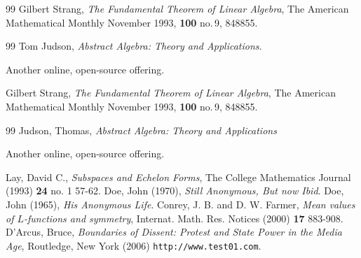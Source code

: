 \documentclass{amsart}
\theoremstyle{plain}%
\theoremstyle{definition}%
\theoremstyle{remark}%
\newcommand{\mono}[1]{\texttt{#1}}
\numberwithin{equation}{section}
\begin{document}
%
%
%
\typeout{************************************************}
\typeout{************************************************}
%

\begin{thebibliography}{99}
\hypertarget{biblio-strang-article-uno}{}Gilbert Strang, \textit{The Fundamental Theorem of Linear Algebra}, The American Mathematical Monthly November 1993, \textbf{100} no.\@\,9, 848\textendash{}855.
\end{thebibliography}
%
%
\typeout{************************************************}
\typeout{************************************************}
%

\begin{thebibliography}{99}
\hypertarget{biblio-judson-AATA}{}Tom Judson, \textit{Abstract Algebra: Theory and Applications}. \par\hypertarget{note-judson-AATA}{}%
Another online, open-source offering.%

\hypertarget{biblio-strang-article-tres}{}Gilbert Strang, \textit{The Fundamental Theorem of Linear Algebra}, The American Mathematical Monthly November 1993, \textbf{100} no.\@\,9, 848\textendash{}855.
\end{thebibliography}
%
%
\typeout{************************************************}
\typeout{************************************************}
%

\begin{thebibliography}{99}
\hypertarget{biblio-judson-aata}{}Judson, Thomas, \textit{Abstract Algebra: Theory and Applications}\par%
Another online, open-source offering.%

\hypertarget{biblio-lay-article}{}Lay, David C., \textit{Subspaces and Echelon Forms}, The College Mathematics Journal (1993) \textbf{24} no. 1 57-62.
\hypertarget{citeproc-py-item-3-later}{}Doe, John (1970), \textit{Still Anonymous, But now Ibid}.
\hypertarget{citeproc-py-item-3}{}Doe, John (1965), \textit{His Anonymous Life}.
\hypertarget{conrey-farmer}{}Conrey, J. B. and D. W. Farmer, \textit{Mean values of \(L\)-functions and symmetry}, Internat. Math. Res. Notices (2000) \textbf{17} 883-908.
\hypertarget{citeproc-py-item-5}{}D'Arcus, Bruce, \textit{Boundaries of Dissent: Protest and State Power in the Media Age}, Routledge, New York (2006) \mono{http:\slash{}\slash{}www.test01.com}.
\end{thebibliography}
%
\end{document}
